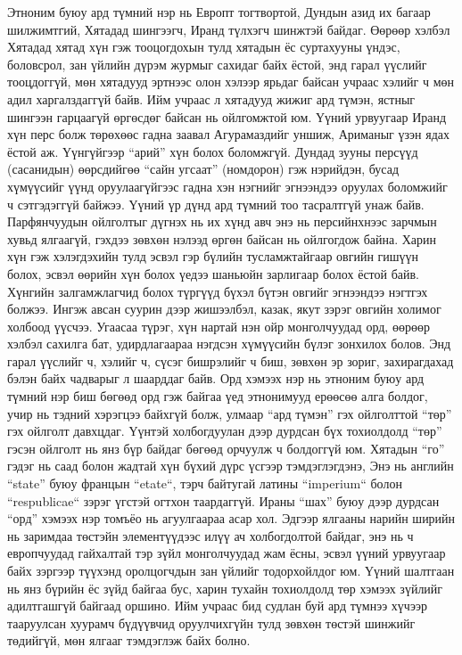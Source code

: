 Этноним буюу ард түмний нэр нь Европт тогтвортой, Дундын азид их багаар шилжимтгий, Хятадад шингээгч, Иранд түлхэгч шинжтэй байдаг. Өөрөөр хэлбэл Хятадад хятад хүн гэж тооцогдохын тулд хятадын ёс суртахууны үндэс, боловсрол, зан үйлийн дүрэм журмыг сахидаг байх ёстой, энд гарал үүслийг тооцдоггүй, мөн хятадууд эртнээс олон хэлээр ярьдаг байсан учраас хэлийг ч мөн адил харгалздаггүй байв. Ийм учраас л хятадууд жижиг ард түмэн, ястныг шингээн гарцаагүй өргөсдөг байсан нь ойлгомжтой юм. Үүний урвуугаар Иранд хүн перс болж төрөхөөс гадна заавал Агурамаздийг уншиж, Ариманыг үзэн ядах ёстой аж. Үүнгүйгээр “арий” хүн болох боломжгүй. Дундад зууны персүүд (сасанидын) өөрсдийгөө “сайн угсаат” (номдорон) гэж нэрийдэн, бусад хүмүүсийг үүнд оруулаагүйгээс гадна хэн нэгнийг эгнээндээ оруулах боломжийг ч сэтгэдэггүй байжээ. Үүний үр дүнд ард түмний тоо тасралтгүй унаж байв. Парфянчуудын ойлголтыг дүгнэх нь их хүнд авч энэ нь персийнхнээс зарчмын хувьд ялгаагүй, гэхдээ зөвхөн нэлээд өргөн байсан нь ойлгогдож байна.
Харин хүн гэж хэлэгдэхийн тулд эсвэл гэр бүлийн тусламжтайгаар овгийн гишүүн болох, эсвэл өөрийн хүн болох үедээ шаньюйн зарлигаар болох ёстой байв. Хүнгийн залгамжлагчид болох түргүүд бүхэл бүтэн овгийг эгнээндээ нэгтгэх болжээ. Ингэж авсан суурин дээр жишээлбэл, казак, якут зэрэг овгийн холимог холбоод үүсчээ. Угаасаа түрэг, хүн нартай нэн ойр монголчуудад орд, өөрөөр хэлбэл сахилга бат, удирдлагаараа нэгдсэн хүмүүсийн бүлэг зонхилох болов. Энд гарал үүслийг ч, хэлийг ч, сүсэг бишрэлийг ч биш, зөвхөн эр зориг, захирагдахад бэлэн байх чадварыг л шаарддаг байв. Орд хэмээх нэр нь этноним буюу ард түмний нэр биш бөгөөд орд гэж байгаа үед этнонимууд ерөөсөө алга болдог, учир нь тэдний хэрэгцээ байхгүй болж, улмаар “ард түмэн” гэх ойлголттой “төр” гэх ойлголт давхцдаг.
Үүнтэй холбогдуулан дээр дурдсан бүх тохиолдолд “төр” гэсэн ойлголт нь янз бүр байдаг бөгөөд орчуулж ч болдоггүй юм. Хятадын “го” гэдэг нь саад болон жадтай хүн бүхий дүрс үсгээр тэмдэглэгдэнэ, Энэ нь английн “state” буюу францын “etate“, тэрч байтугай латины “imperium“ болон “respublicae“ зэрэг үгстэй огтхон таардаггүй. Ираны “шах” буюу дээр дурдсан “орд” хэмээх нэр томъёо нь агуулгаараа асар хол.
Эдгээр ялгааны нарийн ширийн нь заримдаа төстэйн элементүүдээс илүү ач холбогдолтой байдаг, энэ нь ч европчуудад гайхалтай тэр зүйл монголчуудад жам ёсны, эсвэл үүний урвуугаар байх зэргээр түүхэнд оролцогчдын зан үйлийг тодорхойлдог юм. Үүний шалтгаан нь янз бүрийн ёс зүйд байгаа бус, харин тухайн тохиолдолд төр хэмээх зүйлийг адилтгашгүй байгаад оршино. Ийм учраас бид судлан буй ард түмнээ хүчээр тааруулсан хуурамч бүдүүвчид оруулчихгүйн тулд зөвхөн төстэй шинжийг төдийгүй, мөн ялгааг тэмдэглэж байх болно.
